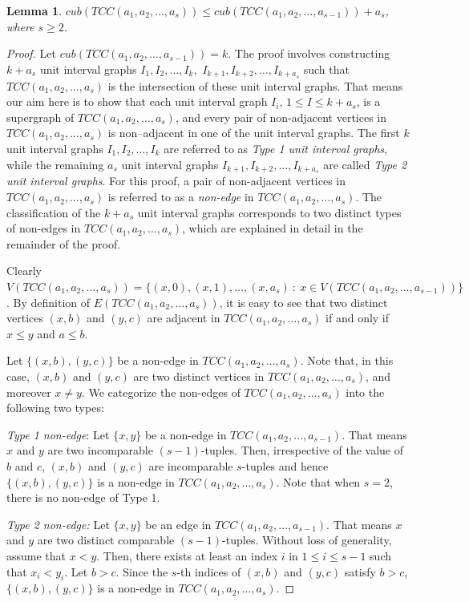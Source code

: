 \documentclass[twoside, 11pt]{article}
\newtheorem{lemma}{Lemma}
\newcommand{\T}{TCC(a_1,a_2,\dots,a_{s-1})}
\newcommand{\TT}{TCC(a_1,a_2,\dots,a_s)}
\begin{document}
\begin{lemma}\label{inductive process}
    $cub(\TT) \leq cub(\T)+a_s$, where $s \geq 2$.
\end{lemma}
\begin{proof} Let \( cub(\T) = k \). The proof involves constructing \( k + a_s \) unit interval graphs \( I_1, I_2, \dots, I_k,\) \(I_{k+1}, I_{k+2}, \dots, I_{k+a_s} \) such that \(\TT\) is the intersection of these unit interval graphs. That means our aim here is to show that each unit interval graph $I_i$, $1 \leq I \leq k+a_s$, is a supergraph of $\TT$, and every pair of non-adjacent vertices in $\TT$ is non--adjacent in one of the unit interval graphs. The first \( k \) unit interval graphs \( I_1, I_2, \dots, I_k \) are referred to as \textit{Type 1 unit interval graphs}, while the remaining \( a_s \) unit interval graphs \( I_{k+1}, I_{k+2}, \dots, I_{k+a_s} \) are called \textit{Type 2 unit interval graphs}. For this proof, a pair of non-adjacent vertices in $\TT$ is referred to as a \textit{non-edge} in \(\TT\). The classification of the \( k + a_s \) unit interval graphs corresponds to two distinct types of non-edges in \(\TT\), which are explained in detail in the remainder of the proof.

Clearly $V(\TT)=\{ (x,0),(x,1),\dots,(x,a_s) \ : \ x \in V(\T)\}$. By definition of $E(\TT)$, it is easy to see that two distinct vertices $(x,b)$ and $(y,c)$ are adjacent in $\TT$ if and only if $x \leq y$ and $a \leq b$.

     Let $\{(x,b),(y,c)\}$ be a non-edge in $\TT$. Note that, in this case, $(x,b)$ and $(y,c)$ are two distinct vertices in $\TT$, and moreover $x \neq y$. We categorize the non-edges of $\TT$ into the following two types:

\vspace{0.2cm}

    \textit{Type 1 non-edge}: Let $\{x,y\}$ be a non-edge in $\T$. That means $x$ and $y$ are two incomparable $(s-1)$-tuples. Then, irrespective of the value of $b$ and $c$, $(x,b)$ and $(y,c)$ are incomparable $s$-tuples and hence $\{(x,b),(y,c)\}$ is a non-edge in $\TT$. Note that when $s=2$, there is no non-edge of Type 1.

    \textit{Type 2 non-edge:} Let $\{x,y\}$ be an edge in $\T$. That means $x$ and $y$ are two distinct comparable $(s-1)$-tuples. Without loss of generality, assume that $x < y$. Then, there exists at least an index $i$ in $1 \leq i \leq s-1$ such that $x_i < y_i$. Let $b > c$. Since the $s$-th indices of $(x,b)$ and $(y,c)$ satisfy $b > c$, $\{(x,b),(y,c)\}$ is a non-edge in $\TT$.


\end{proof}
\end{document}

